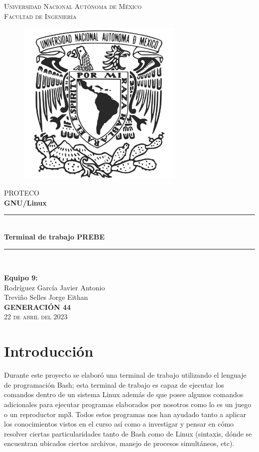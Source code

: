 \documentclass[12pt,a4paper]{article}
\begin{document}
\thispagestyle{empty}

\newcommand{\HRule}{\rule{\linewidth}{0.5mm}}
 \center
 \textsc{\LARGE Universidad Nacional Autónoma de México} \\[0.5cm] \textsc{\Large Facultad de Ingeniería}\\
\begin{figure}[htb]
\centering
\includegraphics[width=8cm]{img/UNAM.jpg}
 \end{figure}
{\large PROTECO\\ \large{\bf GNU/Linux}\\ \vspace*{0.1cm} \vspace*{0.1cm} \vspace*{0.2cm} \vspace*{0.1cm} \HRule \\[0.4cm] { \LARGE \bfseries Terminal de trabajo PREBE} \\ \HRule \\[1cm]}
\large{\bf Equipo 9:}\\Rodríguez García Javier Antonio\\Treviño Selles Jorge Eithan\\
\vspace{0.5cm}\vspace{0.3cm} \large{\bf GENERACIÓN 44}\\
\vspace{0.5cm} {\Large \textsc{22 de abril del 2023}}\\
\newpage
\date{}
\justifying
\tableofcontents
\newpage

\section{Introducción}
\justifying
\noindent
Durante este proyecto se elaboró una terminal de trabajo utilizando el lenguaje de programación Bash; esta terminal de trabajo es capaz de ejecutar los comandos dentro de un sistema Linux además de que posee algunos comandos adicionales para ejecutar programas elaborados por nosotros como lo es un juego o un reproductor mp3. Todos estos programas nos han ayudado tanto a aplicar los conocimientos vistos en el curso así como a investigar y pensar en cómo resolver ciertas particularidades tanto de Bash como de Linux (sintaxis, dónde se encuentran ubicados ciertos archivos, manejo de procesos simultáneos, etc).
\\  
\end{document}
